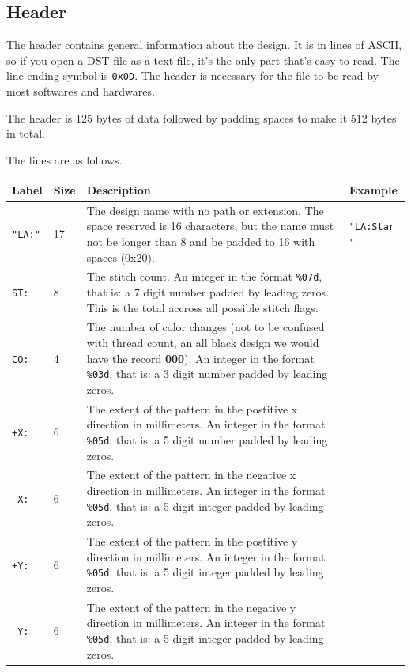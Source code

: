 \documentclass{report}
\begin{document}
\subsection{Header}

The header contains general information about the design. It is in lines of ASCII, so if you open a DST file as a text file, it's the only part that's easy to read. The line ending symbol is \texttt{0x0D}. The header is necessary for the file to be read by most softwares and hardwares.

The header is 125 bytes of data followed by padding spaces to make it 512 bytes in total.

The lines are as follows.

\begin{longtable}{l l p{8cm} l}
\textbf{Label} & \textbf{Size} & \textbf{Description} & \textbf{Example} \\
\hline
\texttt{"LA:"} & 17 & The design name with no path or extension. The space reserved is 16 characters, but the name must not be longer than 8 and be padded to 16 with spaces (0x20). & \texttt{"LA:Star            "} \\
\texttt{ST:} & 8 & The stitch count. An integer in the format \texttt{\%07d}, that is: a 7 digit number padded by leading zeros. This is the total accross all possible stitch flags. & \\
\texttt{CO:} & 4 & The number of color changes (not to be confused with thread count, an all black design we would have the record \textbf{000}). An integer in the format \texttt{\%03d}, that is: a 3 digit number padded by leading zeros. \\
\texttt{+X:} & 6 & The extent of the pattern in the postitive x direction in millimeters. An integer in the format \texttt{\%05d}, that is: a 5 digit number padded by leading zeros. \\
\texttt{-X:} & 6 & The extent of the pattern in the negative x direction in millimeters. An integer in the format \texttt{\%05d}, that is: a 5 digit integer padded by leading zeros. \\
\texttt{+Y:} & 6 & The extent of the pattern in the postitive y direction in millimeters. An integer in the format \texttt{\%05d}, that is: a 5 digit integer padded by leading zeros. \\
\texttt{-Y:} & 6 & The extent of the pattern in the negative y direction in millimeters. An integer in the format \texttt{\%05d}, that is: a 5 digit integer padded by leading zeros. \\

\end{longtable}
\end{document}
